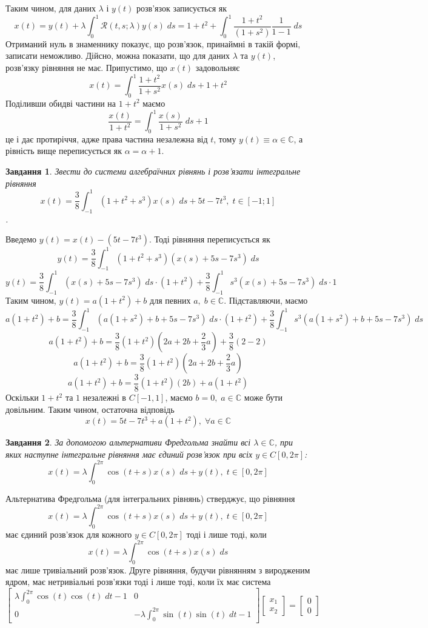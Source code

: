 \documentclass[10pt]{article}
\newtheorem{prob}{Завдання}
\newcommand{\ds}{\;ds}
\begin{document}
	Таким чином, для даних $\lambda$ і $y(t)$ розв’язок записується як
	\[x(t)=y(t)+\lambda\int_{0}^1\mathcal{R}(t, s;\lambda)y( s)\;d s=1+t^2+\int_{0}^1\frac{1+t^2}{(1+s^2)}\frac{1}{1-1}\ds\]
	Отриманий нуль в знаменнику показує, що розв’язок, принаймні в такій формі, записати неможливо. Дійсно, можна показати, що для даних
	$\lambda$ та $y(t)$, розв’язку рівняння не має. Припустимо, що $x(t)$ задовольняє
	\[x(t)=\int_0^1\frac{1+t^2}{1+s^2}x(s)\ds+1+t^2\]
	Поділивши обидві частини на $1+t^2$ маємо
	\[\frac{x(t)}{1+t^2}=\int_0^1\frac{x(s)}{1+s^2}\ds+1\]
	це і дає протиріччя, адже права частина незалежна від $t$, тому $y(t)\equiv\alpha\in\mathbb{C}$, а рівність вище переписується як
	$\alpha=\alpha+1$.
\begin{prob}Звести до системи алгебраїчних рівнянь і розв’язати інтегральне рівняння
	\[x(t)=\frac{3}{8}\int_{-1}^1(1+t^2+s^3)x(s)\ds+5t-7t^3,\;t\in[-1;1]\].
\end{prob}
Введемо $y(t)=x(t)-(5t-7t^3)$. Тоді рівняння переписується як
	\[y(t)=\frac{3}{8}\int_{-1}^1(1+t^2+s^3)(x(s)+5s-7s^3)\ds\]
	\[y(t)=\frac{3}{8}\int_{-1}^1(x(s)+5s-7s^3)\ds\cdot(1+t^2)+\frac{3}{8}\int_{-1}^1s^3(x(s)+5s-7s^3)\ds\cdot1\]
	Таким чином, $y(t)=a(1+t^2)+b$ для певних $a,\;b\in\mathbb{C}$. Підставляючи, маємо
	\[a(1+t^2)+b=\frac{3}{8}\int_{-1}^1(a(1+s^2)+b+5s-7s^3)\ds\cdot(1+t^2)+\frac{3}{8}\int_{-1}^1s^3(a(1+s^2)+b+5s-7s^3)\ds\]
	\[a(1+t^2)+b=\frac{3}{8}(1+t^2)(2a+2b+\frac{2}{3}a)+\frac{3}{8}(2-2)\]
	\[a(1+t^2)+b=\frac{3}{8}(1+t^2)(2a+2b+\frac{2}{3}a)\]
	\[a(1+t^2)+b=\frac{3}{8}(1+t^2)(2b)+a(1+t^2)\]
	Оскільки $1+t^2$ та $1$ незалежні в $C[-1,1]$, маємо $b=0,\;a\in\mathbb{C}$ може бути довільним. Таким чином, остаточна відповідь
	\[x(t)=5t-7t^3+a(1+t^2),\;\forall a\in\mathbb{C}\]
\begin{prob}За допомогою альтернативи Фредгольма знайти всі $\lambda\in\mathbb{C}$, при яких наступне інтегральне рівняння має єдиний
	розв’язок при всіх $y\in C[0,2\pi]$:
	\[x(t)=\lambda\int_0^{2\pi}\cos(t+s)x(s)\ds+y(t),\;t\in[0,2\pi]\]
\end{prob}
Альтернатива Фредгольма (для інтегральних рівнянь) стверджує, що рівняння 
	\[x(t)=\lambda\int_0^{2\pi}\cos(t+s)x(s)\ds+y(t),\;t\in[0,2\pi]\]
	має єдиний розв’язок для кожного $y\in C[0,2\pi]$ тоді і лише тоді, коли
	\[x(t)=\lambda\int_0^{2\pi}\cos(t+s)x(s)\ds\]
має лише тривіальний розв’язок. Друге рівняння, будучи рівнянням з виродженим ядром,
має нетривіальні розв’язки тоді і лише тоді, коли їх має система
\[\begin{bmatrix}\lambda\int_0^{2\pi}\cos(t)\cos(t)\;dt-1&0\\0&-\lambda\int_0^{2\pi}\sin(t)\sin(t)\;dt-1\end{bmatrix}
	\begin{bmatrix}x_1\\x_2\end{bmatrix}=\begin{bmatrix}0\\0\end{bmatrix}\]
\end{document}
